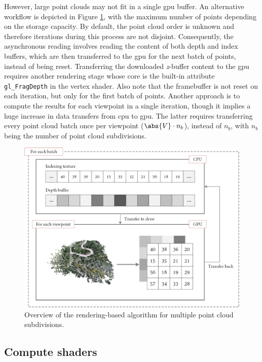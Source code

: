 However, large point clouds may not fit in a single \acrshort{gpu} buffer. An alternative workflow is depicted in Figure \ref{fig:occlusion_opengl_zbuffer_multiple_batches}, with the maximum number of points depending on the storage capacity. By default, the point cloud order is unknown and therefore iterations during this process are not disjoint. Consequently, the asynchronous reading involves reading the content of both depth and index buffers, which are then transferred to the \acrshort{gpu} for the next batch of points, instead of being reset. Transferring the downloaded \textit{z}-buffer content to the \acrshort{gpu} requires another rendering stage whose core is the built-in attribute \verb|gl_FragDepth| in the vertex shader. Also note that the framebuffer is not reset on each iteration, but only for the first batch of points. Another approach is to compute the results for each viewpoint in a single iteration, though it implies a huge increase in data transfers from \acrshort{cpu} to \acrshort{gpu}. The latter requires transferring every point cloud batch once per viewpoint ($\abs{V} \cdot n_{b}$), instead of $n_{b}$, with $n_{b}$ being the number of point cloud subdivisions.

\begin{figure}[htb]
    \centering
    \includegraphics[width=.95\linewidth]{figs/multi_thermal_projection/multiple_batches_opengl_gpu.png}
    \caption{Overview of the rendering-based algorithm for multiple point cloud subdivisions.}
    \label{fig:occlusion_opengl_zbuffer_multiple_batches}
\end{figure}

\subsection{Compute shaders}

